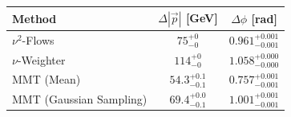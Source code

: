     \begin{tabular}{lcc}
        \toprule
        Method & $\Delta |\vec p|$ [GeV] & $\Delta \phi$ [rad] \\
        \midrule
        $\nu^2$-Flows & $75_{-0}^{+0}$ & $0.961_{-0.001}^{+0.001}$ \\
        $\nu$-Weighter & $114_{-0}^{+0}$ & $1.058_{-0.000}^{+0.000}$ \\
        MMT (Mean) & $54.3_{-0.1}^{+0.1}$ & $0.757_{-0.001}^{+0.001}$ \\
        MMT (Gaussian Sampling) & $69.4_{-0.1}^{+0.0}$ & $1.001_{-0.001}^{+0.001}$ \\
        \bottomrule
    \end{tabular}